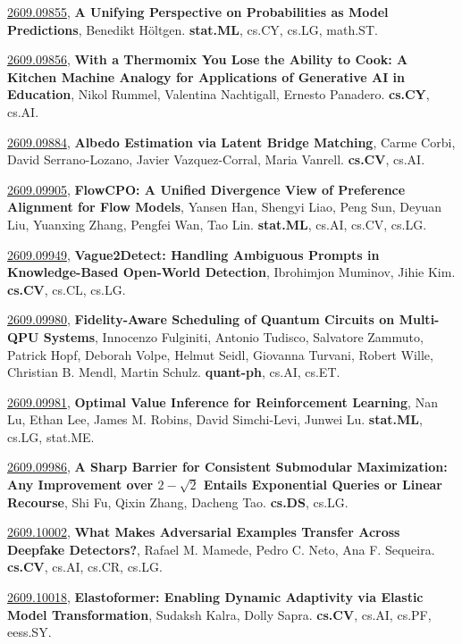 \documentclass[9pt, a4paper]{article}
\theoremstyle{plain}
\theoremstyle{definition}
\theoremstyle{remark}
\newcommand{\arxivwithtarget}[3]{\hypertarget{#1}{}\href{https://arxiv.org/abs/#1}{#1}, \textbf{\textcolor{arxivblue}{#2}}, #3. }
\begin{document}
\arxivwithtarget{2609.09855}{A Unifying Perspective on Probabilities as Model Predictions}{Benedikt Höltgen}\textbf{stat.ML}, cs.CY, cs.LG, math.ST.



\arxivwithtarget{2609.09856}{With a Thermomix You Lose the Ability to Cook: A Kitchen Machine Analogy for Applications of Generative AI in Education}{Nikol Rummel, Valentina Nachtigall, Ernesto Panadero}\textbf{cs.CY}, cs.AI.



\arxivwithtarget{2609.09884}{Albedo Estimation via Latent Bridge Matching}{Carme Corbi, David Serrano-Lozano, Javier Vazquez-Corral, Maria Vanrell}\textbf{cs.CV}, cs.AI.



\arxivwithtarget{2609.09905}{FlowCPO: A Unified Divergence View of Preference Alignment for Flow Models}{Yansen Han, Shengyi Liao, Peng Sun, Deyuan Liu, Yuanxing Zhang, Pengfei Wan, Tao Lin}\textbf{stat.ML}, cs.AI, cs.CV, cs.LG.



\arxivwithtarget{2609.09949}{Vague2Detect: Handling Ambiguous Prompts in Knowledge-Based Open-World Detection}{Ibrohimjon Muminov, Jihie Kim}\textbf{cs.CV}, cs.CL, cs.LG.



\arxivwithtarget{2609.09980}{Fidelity-Aware Scheduling of Quantum Circuits on Multi-QPU Systems}{Innocenzo Fulginiti, Antonio Tudisco, Salvatore Zammuto, Patrick Hopf, Deborah Volpe, Helmut Seidl, Giovanna Turvani, Robert Wille, Christian B. Mendl, Martin Schulz}\textbf{quant-ph}, cs.AI, cs.ET.



\arxivwithtarget{2609.09981}{Optimal Value Inference for Reinforcement Learning}{Nan Lu, Ethan Lee, James M. Robins, David Simchi-Levi, Junwei Lu}\textbf{stat.ML}, cs.LG, stat.ME.



\arxivwithtarget{2609.09986}{A Sharp Barrier for Consistent Submodular Maximization: Any Improvement over $2-\sqrt{2}$ Entails Exponential Queries or Linear Recourse}{Shi Fu, Qixin Zhang, Dacheng Tao}\textbf{cs.DS}, cs.LG.



\arxivwithtarget{2609.10002}{What Makes Adversarial Examples Transfer Across Deepfake Detectors?}{Rafael M. Mamede, Pedro C. Neto, Ana F. Sequeira}\textbf{cs.CV}, cs.AI, cs.CR, cs.LG.



\arxivwithtarget{2609.10018}{Elastoformer: Enabling Dynamic Adaptivity via Elastic Model Transformation}{Sudaksh Kalra, Dolly Sapra}\textbf{cs.CV}, cs.AI, cs.PF, eess.SY.
\end{document}

